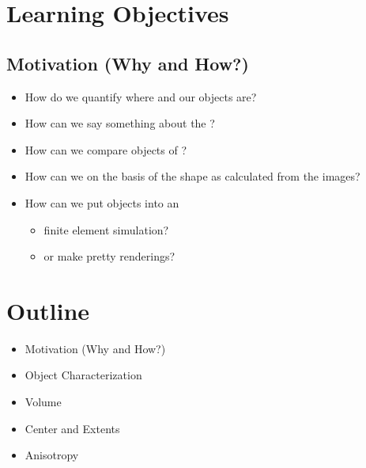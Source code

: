 \documentclass[letterpaper,10pt,english]{sphinxmanual}
\begin{document}
\section{Learning Objectives}
\label{\detokenize{06-ShapeAnalysis:learning-objectives}}

\subsection{Motivation (Why and How?)}
\label{\detokenize{06-ShapeAnalysis:motivation-why-and-how}}\begin{itemize}
\item {} 
\sphinxAtStartPar
How do we quantify where and  our objects are?

\item {} 
\sphinxAtStartPar
How can we say something about the ?

\item {} 
\sphinxAtStartPar
How can we compare objects of ?

\item {} 
\sphinxAtStartPar
How can we  on the basis of the shape as calculated from the images?

\item {} 
\sphinxAtStartPar
How can we put objects into an
\begin{itemize}
\item {} 
\sphinxAtStartPar
finite element simulation?

\item {} 
\sphinxAtStartPar
or make pretty renderings?

\end{itemize}

\end{itemize}


\section{Outline}
\label{\detokenize{06-ShapeAnalysis:outline}}\begin{itemize}
\item {} 
\sphinxAtStartPar
Motivation (Why and How?)

\item {} 
\sphinxAtStartPar
Object Characterization

\item {} 
\sphinxAtStartPar
Volume

\item {} 
\sphinxAtStartPar
Center and Extents

\item {} 
\sphinxAtStartPar
Anisotropy

\end{itemize}
\end{document}
